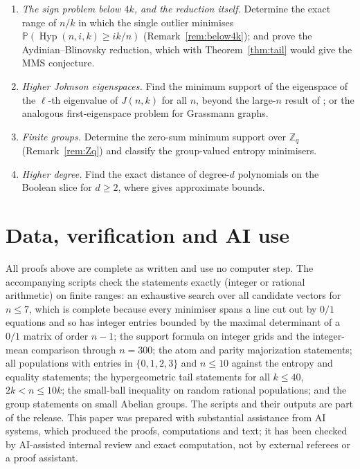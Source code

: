 \documentclass[11pt]{article}
\theoremstyle{remark}
\newcommand{\Z}{\mathbb Z}
\newcommand{\Prb}{\mathbb P}
\newcommand{\Hyp}{\operatorname{Hyp}}
\begin{document}
\begin{enumerate}
\item \emph{The sign problem below \(4k\), and the reduction itself.} Determine
the exact range of \(n/k\) in which the single outlier minimises
\(\Prb(\Hyp(n,i,k)\ge ik/n)\) (Remark~\ref{rem:below4k}); and prove the
Aydinian--Blinovsky reduction, which with Theorem~\ref{thm:tail} would give the
MMS conjecture.
\item \emph{Higher Johnson eigenspaces.} Find the minimum support of the
eigenspace of the \(\ell\)-th eigenvalue of \(J(n,k)\) for all \(n\), beyond
the large-\(n\) result of \cite{VMV}; or the analogous first-eigenspace problem
for Grassmann graphs.
\item \emph{Finite groups.} Determine the zero-sum minimum support over
\(\Z_q\) (Remark~\ref{rem:Zq}) and classify the group-valued entropy
minimisers.
\item \emph{Higher degree.} Find the exact distance of degree-\(d\) polynomials
on the Boolean slice for \(d\ge2\), where \cite{ABSS} gives approximate bounds.
\end{enumerate}

\section*{Data, verification and AI use}\label{sec:data}
All proofs above are complete as written and use no computer step. The
accompanying scripts check the statements exactly (integer or rational
arithmetic) on finite ranges: an exhaustive search over all candidate vectors
for \(n\le7\), which is complete because every minimiser spans a line cut out
by \(0/1\) equations and so has integer entries bounded by the maximal
determinant of a \(0/1\) matrix of order \(n-1\); the support formula on
integer grids and the integer-mean comparison through \(n=300\); the atom and
parity majorization statements; all populations with entries in \(\{0,1,2,3\}\) and \(n\le10\) against the entropy
and equality statements; the hypergeometric tail statements for all
\(k\le40\), \(2k<n\le10k\); the small-ball inequality on random rational
populations; and the group statements on small Abelian groups. The scripts and their outputs are part of the
release. This paper was prepared with substantial assistance from AI
systems, which produced the proofs, computations and text; it has been checked
by AI-assisted internal review and exact computation, not by external referees
or a proof assistant.
\end{document}
